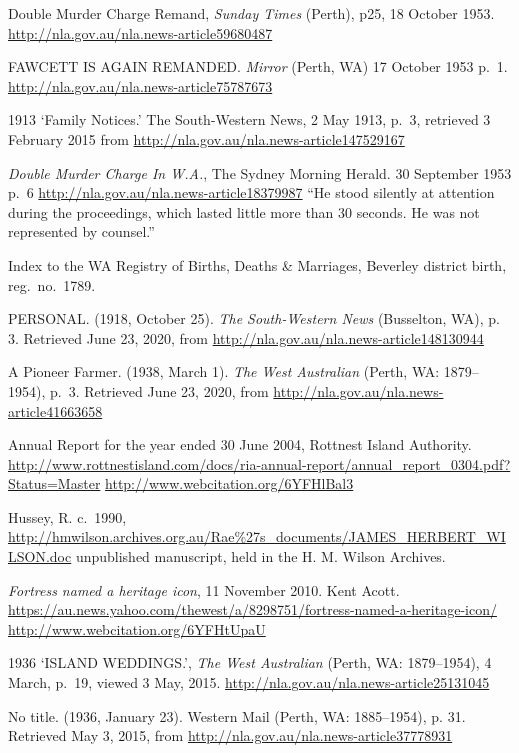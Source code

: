 \begin{thebibliography}{999}
	Double Murder Charge Remand, \emph{Sunday Times} (Perth), p25, 18 October 1953.
	\url{http://nla.gov.au/nla.news-article59680487}

	FAWCETT IS AGAIN REMANDED. \emph{Mirror} (Perth, WA) 17 October 1953 p.\ 1.
	\url{http://nla.gov.au/nla.news-article75787673}

	1913 `Family Notices.' The South-Western News, 2 May 1913, p.~3,
	retrieved 3 February 2015 from \url{http://nla.gov.au/nla.news-article147529167}

	\emph{Double Murder Charge In W.A.}, The Sydney Morning Herald. 30 September 1953 p.~6
	\url{http://nla.gov.au/nla.news-article18379987}
	``He stood silently at attention during the proceedings, which lasted little more than 30 seconds.
	He was not represented by counsel.''

	Index to the WA Registry of Births, Deaths \& Marriages, Beverley district birth, reg.~no.~1789.

	PERSONAL. (1918, October 25). \emph{The South-Western News} (Busselton, WA), p. 3.
	Retrieved June 23, 2020, from \url{http://nla.gov.au/nla.news-article148130944}

	A Pioneer Farmer. (1938, March 1). \emph{The West Australian} (Perth, WA: 1879--1954), p.\ 3.
	Retrieved June 23, 2020, from \url{http://nla.gov.au/nla.news-article41663658}

	Annual Report for the year ended 30 June 2004, Rottnest Island Authority.
	\url{http://www.rottnestisland.com/docs/ria-annual-report/annual_report_0304.pdf?Status=Master}
	\url{http://www.webcitation.org/6YFHlBal3}

	Hussey, R. c.~1990, \url{http://hmwilson.archives.org.au/Rae\%27s_documents/JAMES_HERBERT_WILSON.doc}
	unpublished manuscript, held in the  H. M. Wilson Archives.

	\emph{Fortress named a heritage icon}, 11 November 2010. Kent Acott.
	\url{https://au.news.yahoo.com/thewest/a/8298751/fortress-named-a-heritage-icon/}
	\url{http://www.webcitation.org/6YFHtUpaU}

	1936 `ISLAND WEDDINGS.', \emph{The West Australian} (Perth, WA: 1879--1954), 4 March, p.\ 19, viewed 3 May, 2015.
	\url{http://nla.gov.au/nla.news-article25131045}

	No title. (1936, January 23). Western Mail (Perth, WA: 1885--1954), p. 31. Retrieved May 3, 2015,
	from \url{http://nla.gov.au/nla.news-article37778931}


\end{thebibliography}
